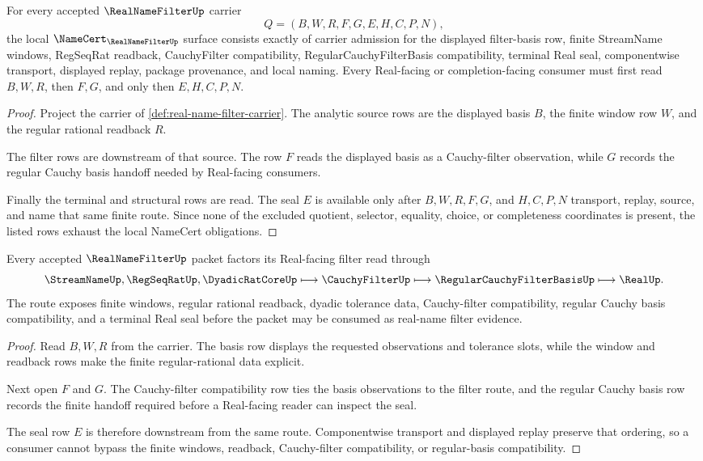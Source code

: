 \begin{theorem}
\label{thm:real-name-filter-namecert-obligations}
For every accepted $\RealNameFilterUp$ carrier
$$
Q=(B,W,R,F,G,E,H,C,P,N),
$$
the local $\NameCert_{\RealNameFilterUp}$ surface consists exactly of carrier admission for the displayed filter-basis row, finite StreamName windows, RegSeqRat readback, CauchyFilter compatibility, RegularCauchyFilterBasis compatibility, terminal Real seal, componentwise transport, displayed replay, package provenance, and local naming. Every Real-facing or completion-facing consumer must first read $B,W,R$, then $F,G$, and only then $E,H,C,P,N$.
\end{theorem}
\begin{proof}
Project the carrier of \autoref{def:real-name-filter-carrier}. The analytic source rows are the displayed basis $B$, the finite window row $W$, and the regular rational readback $R$.

The filter rows are downstream of that source. The row $F$ reads the displayed basis as a Cauchy-filter observation, while $G$ records the regular Cauchy basis handoff needed by Real-facing consumers.

Finally the terminal and structural rows are read. The seal $E$ is available only after $B,W,R,F,G$, and $H,C,P,N$ transport, replay, source, and name that same finite route. Since none of the excluded quotient, selector, equality, choice, or completeness coordinates is present, the listed rows exhaust the local NameCert obligations.
\end{proof}

\begin{theorem}
\label{thm:real-name-filter-regular-cauchy-handoff}
Every accepted $\RealNameFilterUp$ packet factors its Real-facing filter read through
$$
\StreamNameUp,\RegSeqRatUp,\DyadicRatCoreUp \longmapsto \CauchyFilterUp \longmapsto \RegularCauchyFilterBasisUp \longmapsto \RealUp .
$$
The route exposes finite windows, regular rational readback, dyadic tolerance data, Cauchy-filter compatibility, regular Cauchy basis compatibility, and a terminal Real seal before the packet may be consumed as real-name filter evidence.
\end{theorem}
\begin{proof}
Read $B,W,R$ from the carrier. The basis row displays the requested observations and tolerance slots, while the window and readback rows make the finite regular-rational data explicit.

Next open $F$ and $G$. The Cauchy-filter compatibility row ties the basis observations to the filter route, and the regular Cauchy basis row records the finite handoff required before a Real-facing reader can inspect the seal.

The seal row $E$ is therefore downstream from the same route. Componentwise transport and displayed replay preserve that ordering, so a consumer cannot bypass the finite windows, readback, Cauchy-filter compatibility, or regular-basis compatibility.
\end{proof}

